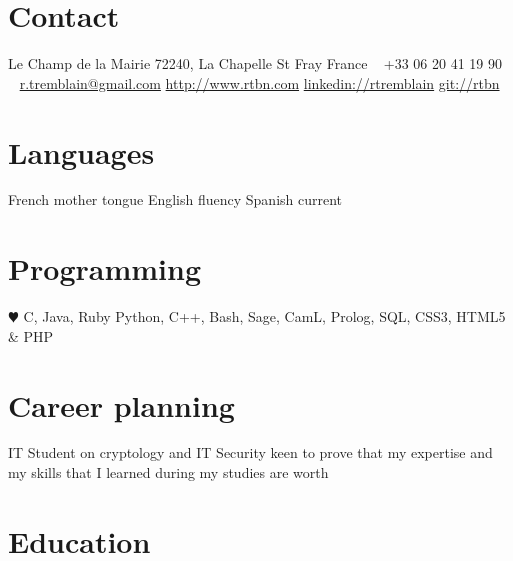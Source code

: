 \documentclass[]{friggeri-cv} %
\begin{document}


\begin{aside} %
\section{Contact}
Le Champ de la Mairie
72240, La Chapelle St Fray
France
~
+33 06 20 41 19 90
~
\href{mailto:r.tremblain@gmail.com}{r.tremblain@gmail.com}
\href{http://www.rtbn.com}{http://www.rtbn.com}
\href{fr.linkedin.com/in/rtremblain}{linkedin://rtremblain}
\href{http://github.com/rtbn}{git://rtbn}
\section{Languages}
French mother tongue
English fluency
Spanish current
\section{Programming}
{\color{red} $\varheartsuit$} C, Java, Ruby
Python, C++, Bash, Sage, CamL, Prolog, SQL,
CSS3, HTML5 \& PHP
\end{aside}


\section{Career planning }

IT Student on cryptology and IT Security keen to prove that my expertise and my skills that I learned during my studies are worth


\section{Education}
\end{document}
